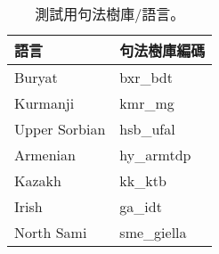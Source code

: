 \begin{table}[h!]
\centering
\begin{subtable}[t]{.5\textwidth}
    \begin{tabular}[t]{|l l|}
        \hline
        \textbf{語言} & \textbf{句法樹庫編碼} \\
        \hline
        Buryat & bxr\_bdt \\
        Kurmanji & kmr\_mg \\
        Upper Sorbian & hsb\_ufal \\
        Armenian & hy\_armtdp \\
        Kazakh & kk\_ktb \\
        Irish & ga\_idt \\
        North Sami & sme\_giella \\
        \hline
    \end{tabular}
\end{subtable}%
\caption{測試用句法樹庫/語言。}
\label{tab:testing_languages}
\end{table}